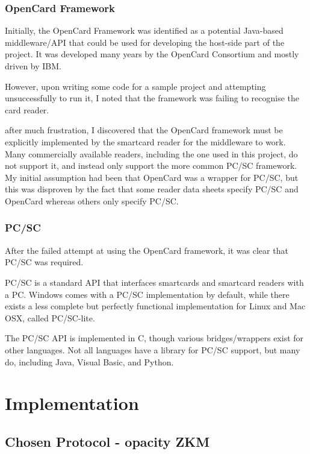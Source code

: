 \documentclass[12pt,a4paper]{article}
\begin{document}
\subsubsection{OpenCard Framework}
Initially, the OpenCard Framework \cite{ocf} was identified as a potential Java-based middleware/API that could be used for developing the host-side part of the project. It was developed many years by the OpenCard Consortium and mostly driven by IBM.

However, upon writing some code for a sample project and attempting unsuccessfully to run it, I noted that the framework was failing to recognise the card reader.

after much frustration, I discovered that the OpenCard framework must be explicitly implemented by the smartcard reader for the middleware to work. Many commercially available readers, including  the one used in this project, do not support it, and instead only support the more common PC/SC framework. My initial assumption had been that OpenCard was a wrapper for PC/SC, but this was disproven by the fact that some reader data sheets specify PC/SC and OpenCard whereas others only specify PC/SC.

\subsubsection{PC/SC}
After the failed attempt at using the OpenCard framework, it was clear that PC/SC was required. 

PC/SC \cite{pcsc} is a standard API that interfaces smartcards and smartcard readers with a PC. Windows comes with a PC/SC implementation by default, while there exists a less complete but perfectly functional implementation for Linux and Mac OSX, called PC/SC-lite. 

The PC/SC API is implemented in C, though various bridges/wrappers exist for other languages. Not all languages have a library for PC/SC support, but many do, including Java, Visual Basic, and Python.





\pagebreak
\section{Implementation}

\subsection{Chosen Protocol - opacity ZKM}
\end{document}
